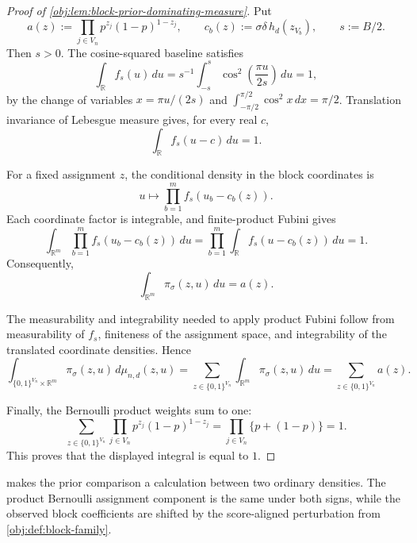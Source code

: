 \documentclass[11pt]{article}
\begin{document}
\begin{proof}[Proof of \cref{obj:lem:block-prior-dominating-measure}]
Put
\[
a(z):=\prod_{j\in V_n}p^{z_j}(1-p)^{1-z_j},
\qquad
c_b(z):=\sigma\delta\,h_d(z_{V_b}),
\qquad
s:=B/2 .
\]
Then \(s>0\).  The cosine-squared baseline satisfies
\[
\int_{\mathbb R} f_s(u)\,du
=
s^{-1}\int_{-s}^{s}\cos^2\!\left(\frac{\pi u}{2s}\right)\,du
=1,
\]
by the change of variables \(x=\pi u/(2s)\) and
\(\int_{-\pi/2}^{\pi/2}\cos^2 x\,dx=\pi/2\).  Translation invariance of Lebesgue measure gives, for every real \(c\),
\[
\int_{\mathbb R} f_s(u-c)\,du=1 .
\]

For a fixed assignment \(z\), the conditional density in the block coordinates is
\[
u\longmapsto \prod_{b=1}^{m} f_s(u_b-c_b(z)).
\]
Each coordinate factor is integrable, and finite-product Fubini gives
\[
\int_{\mathbb R^m}\prod_{b=1}^{m} f_s(u_b-c_b(z))\,du
=
\prod_{b=1}^{m}\int_{\mathbb R}f_s(u-c_b(z))\,du
=
1 .
\]
Consequently,
\[
\int_{\mathbb R^m}\pi_\sigma(z,u)\,du
=
a(z).
\]

The measurability and integrability needed to apply product Fubini follow from measurability of \(f_s\), finiteness of the assignment space, and integrability of the translated coordinate densities.  Hence
\[
\int_{\{0,1\}^{V_n}\times\mathbb R^m}
\pi_\sigma(z,u)\,d\mu_{n,d}(z,u)
=
\sum_{z\in\{0,1\}^{V_n}}
\int_{\mathbb R^m}\pi_\sigma(z,u)\,du
=
\sum_{z\in\{0,1\}^{V_n}} a(z).
\]

Finally, the Bernoulli product weights sum to one:
\[
\sum_{z\in\{0,1\}^{V_n}}
\prod_{j\in V_n}p^{z_j}(1-p)^{1-z_j}
=
\prod_{j\in V_n}\{p+(1-p)\}
=
1 .
\]
This proves that the displayed integral is equal to \(1\). %
\end{proof}

 makes the prior comparison a calculation between two ordinary densities. The product Bernoulli assignment component is the same under both signs, while the observed block coefficients are shifted by the score-aligned perturbation from \cref{obj:def:block-family}.
\end{document}
